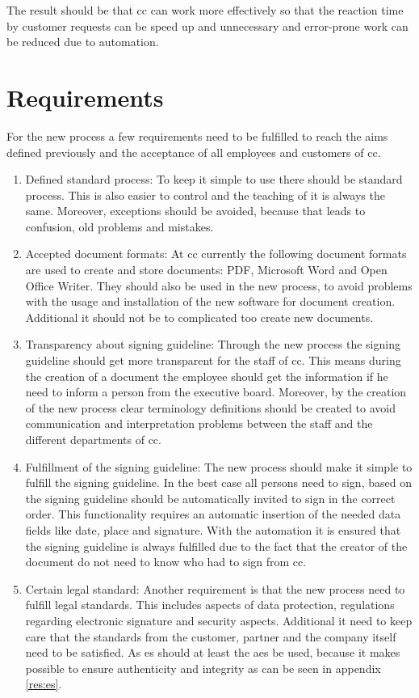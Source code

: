 The result should be that \gls{cc} can work more effectively so that the reaction time by customer requests can be speed up and unnecessary and error-prone work can be reduced due to automation.

\section{Requirements}
For the new process a few requirements need to be fulfilled to reach the aims defined previously and the acceptance of all employees and customers of \gls{cc}.
\begin{enumerate}
	\item Defined standard process: \newline
	To keep it simple to use there should be standard process. This is also easier to control and the teaching of it is always the same. Moreover, exceptions should be avoided, because that leads to confusion, old problems and mistakes.
	\item Accepted document formats: \newline
	At \gls{cc} currently the following document formats are used to create and store documents: \gls{PDF}, Microsoft Word and Open Office Writer. They should also be used in the new process, to avoid problems with the usage and installation of the new software for document creation. Additional it should not be to complicated too create new documents.
	\item Transparency about signing guideline: \newline
	Through the new process the signing guideline should get more transparent for the staff of \gls{cc}. This means during the creation of a document the employee should get the information if he need to inform a person from the executive board. Moreover, by the creation of the new process clear terminology definitions should be created to avoid communication and interpretation problems between the staff and the different departments of \gls{cc}.
	\item Fulfillment of the signing guideline:\newline
	The new process should make it simple to fulfill the signing guideline. In the best case all persons need to sign, based on the signing guideline should be automatically invited to sign in the correct order. This functionality requires an automatic insertion of the needed data fields like date, place and signature. With the automation it is ensured that the signing guideline is always fulfilled due to the fact that the creator of the document do not need to know who had to sign from \gls{cc}.
	\item Certain legal standard: \newline
	Another requirement is that the new process need to fulfill legal standards. This includes aspects of data protection, regulations regarding electronic signature and security aspects. Additional it need to keep care that the standards from the customer, partner and the company itself need to be satisfied. \newline
	As \gls{es} should at least the \gls{aes} be used, because it makes possible to ensure authenticity and integrity as can be seen in appendix \ref{res:es}. 
\end{enumerate}
